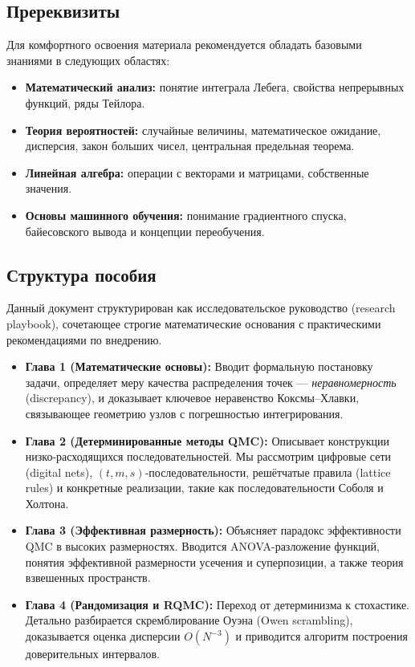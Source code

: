 \documentclass[12pt, a4paper]{article}
\theoremstyle{plain}
\theoremstyle{definition}
\theoremstyle{remark}
\begin{document}
\subsection*{Пререквизиты}
Для комфортного освоения материала рекомендуется обладать базовыми знаниями в следующих областях:
\begin{itemize}
    \item \textbf{Математический анализ:} понятие интеграла Лебега, свойства непрерывных функций, ряды Тейлора.
    \item \textbf{Теория вероятностей:} случайные величины, математическое ожидание, дисперсия, закон больших чисел, центральная предельная теорема.
    \item \textbf{Линейная алгебра:} операции с векторами и матрицами, собственные значения.
    \item \textbf{Основы машинного обучения:} понимание градиентного спуска, байесовского вывода и концепции переобучения.
\end{itemize}

\subsection*{Структура пособия}
Данный документ структурирован как исследовательское руководство (research playbook), сочетающее строгие математические основания с практическими рекомендациями по внедрению.

\begin{itemize}
    \item \textbf{Глава 1 (Математические основы):} Вводит формальную постановку задачи, определяет меру качества распределения точек --- \textit{неравномерность} (discrepancy), и доказывает ключевое неравенство Коксмы--Хлавки, связывающее геометрию узлов с погрешностью интегрирования.
    
    \item \textbf{Глава 2 (Детерминированные методы QMC):} Описывает конструкции низко-расходящихся последовательностей. Мы рассмотрим цифровые сети (digital nets), $(t,m,s)$-последовательности, решётчатые правила (lattice rules) и конкретные реализации, такие как последовательности Соболя и Холтона.
    
    \item \textbf{Глава 3 (Эффективная размерность):} Объясняет парадокс эффективности QMC в высоких размерностях. Вводится ANOVA-разложение функций, понятия эффективной размерности усечения и суперпозиции, а также теория взвешенных пространств.
    
    \item \textbf{Глава 4 (Рандомизация и RQMC):} Переход от детерминизма к стохастике. Детально разбирается скремблирование Оуэна (Owen scrambling), доказывается оценка дисперсии $O(N^{-3})$ и приводится алгоритм построения доверительных интервалов.
        
\end{itemize}
\end{document}
